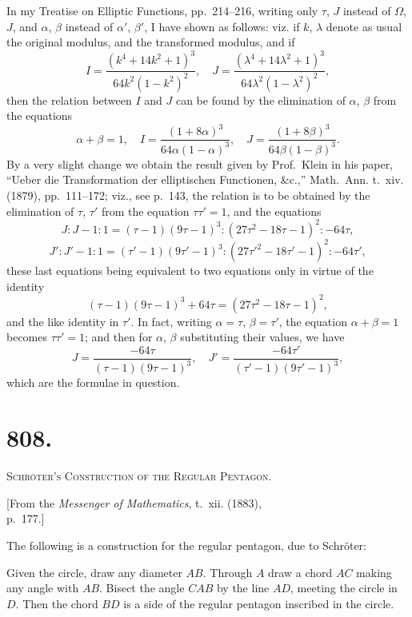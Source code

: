 \documentclass[11pt,a4paper]{book}
\begin{document}
In my Treatise on Elliptic Functions, pp.~214--216, writing only $\tau$, $J$ instead of $\Omega$, $J$, and $\alpha$, $\beta$ instead of $\alpha'$, $\beta'$, I have shown as follows: viz. if $k$, $\lambda$ denote as usual the original modulus, and the transformed modulus, and if
\[
I = \frac{(k^4 + 14k^2 + 1)^3}{64k^2(1-k^2)^2}, \quad
J = \frac{(\lambda^4 + 14\lambda^2 + 1)^3}{64\lambda^2(1-\lambda^2)^2},
\]
then the relation between $I$ and $J$ can be found by the elimination of $\alpha$, $\beta$ from the equations
\[
\alpha + \beta = 1, \quad
I = \frac{(1 + 8\alpha)^3}{64\alpha(1-\alpha)^3}, \quad
J = \frac{(1 + 8\beta)^3}{64\beta(1-\beta)^3}.
\]
By a very slight change we obtain the result given by Prof.~Klein in his paper, ``Ueber die Transformation der elliptischen Functionen, \&c.,'' Math.~Ann. t.~xiv. (1879), pp.~111--172; viz., see p.~143, the relation is to be obtained by the elimination of $\tau$, $\tau'$ from the equation $\tau\tau' = 1$, and the equations
\[
J : J-1 : 1 = (\tau-1)(9\tau-1)^3 : (27\tau^2 - 18\tau - 1)^2 : -64\tau,
\]
\[
J' : J'-1 : 1 = (\tau'-1)(9\tau'-1)^3 : (27\tau'^2 - 18\tau' - 1)^2 : -64\tau',
\]
these last equations being equivalent to two equations only in virtue of the identity
\[
(\tau - 1)(9\tau - 1)^3 + 64\tau = (27\tau^2 - 18\tau - 1)^2,
\]
and the like identity in $\tau'$. In fact, writing $\alpha = \tau$, $\beta = \tau'$, the equation $\alpha + \beta = 1$ becomes $\tau\tau' = 1$; and then for $\alpha$, $\beta$ substituting their values, we have
\[
J = \frac{-64\tau}{(\tau-1)(9\tau-1)^3}, \quad
J' = \frac{-64\tau'}{(\tau'-1)(9\tau'-1)^3},
\]
which are the formulae in question.



\newpage
\section*{808.}
\begin{center}
{\large\scshape Schr\"{o}ter's Construction of the Regular Pentagon.}
\end{center}

\begin{flushright}
\small[From the \textit{Messenger of Mathematics}, t.~xii. (1883),\\
p.~177.]
\end{flushright}

The following is a construction for the regular pentagon, due to Schr\"{o}ter:

Given the circle, draw any diameter $AB$. Through $A$ draw a chord $AC$ making any angle with $AB$. Bisect the angle $CAB$ by the line $AD$, meeting the circle in $D$. Then the chord $BD$ is a side of the regular pentagon inscribed in the circle.
\end{document}
